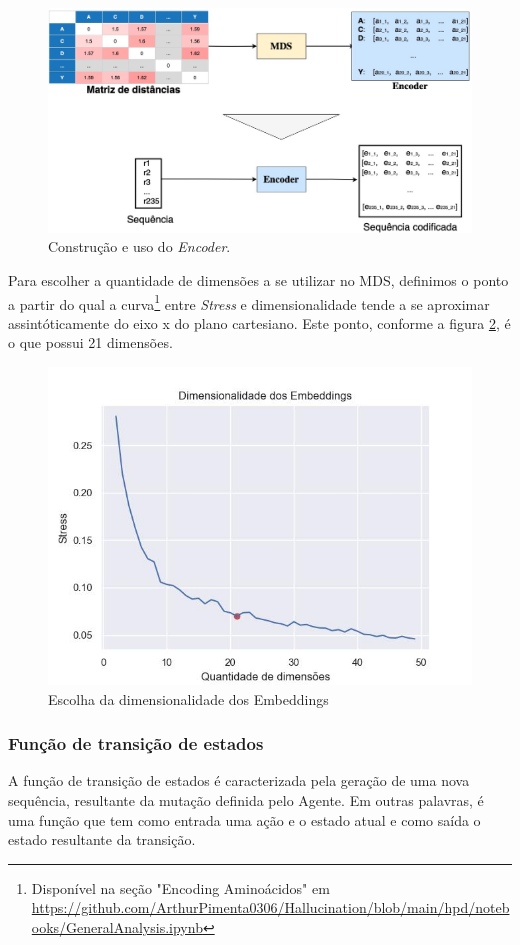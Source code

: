 \begin{figure}[H]
  \centering
  \includegraphics[width=.8\textwidth]{figuras/metodologia-encoder.jpg}
  \caption{Construção e uso do \textit{Encoder}. }
  \label{fig:encoder}
\end{figure}

Para escolher a quantidade de dimensões a se utilizar no MDS, 
definimos o ponto a partir do qual a curva\footnote{Disponível na seção "Encoding Aminoácidos" em \url{https://github.com/ArthurPimenta0306/Hallucination/blob/main/hpd/notebooks/GeneralAnalysis.ipynb}} entre \textit{Stress} e dimensionalidade 
tende a se aproximar assintóticamente do eixo x do plano cartesiano. 
Este ponto, conforme a figura \ref{fig:best_dim}, é o que possui 21 dimensões. 

\begin{figure}[H]
  \centering
  \includegraphics[width=.8\textwidth]{figuras/best_dim.jpg}
  \caption{Escolha da dimensionalidade dos Embeddings}
  \label{fig:best_dim}
\end{figure}


\subsubsection{Função de transição de estados}
A função de transição de estados é caracterizada pela geração de uma nova sequência, 
resultante da mutação definida pelo Agente. 
Em outras palavras, é uma função que tem como entrada uma ação e o estado atual e como saída o estado resultante da transição. 


